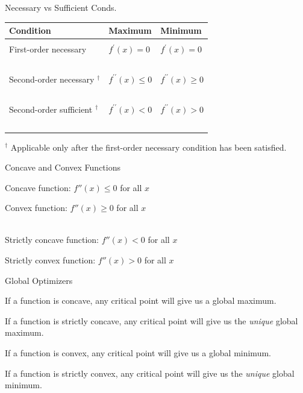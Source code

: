 \documentclass{./../../Latex/teaching_slides}
\begin{document}
\begin{frame}{Necessary vs Sufficient Conds.}
\begin{tabularx}{\textwidth}{lXX}
\hline Condition & Maximum & Minimum \\
\hline \\ 
First-order necessary & $f^{\prime}(x)=0$ & $f^{\prime}(x)=0$ \\~\\
Second-order necessary ${ }^{\dagger}$ & $f^{\prime \prime}(x) \leq 0$ & $f^{\prime \prime}(x) \geq 0$ \\~\\
Second-order sufficient ${ }^{\dagger}$ & $f^{\prime \prime}(x)<0$ & $f^{\prime \prime}(x)>0$ \\~\\
\hline
\end{tabularx}
\vspace{0.25em}

${ }^{\dagger}$ Applicable only after the first-order necessary condition has been satisfied.
\end{frame}

\begin{frame}{Concave and Convex Functions}
\begin{witemize}
  \item Concave function: $ f''(x) \leq 0$ for all $x$ 
  \item Convex function: $ f''(x) \geq 0$ for all $x$ \\~\\
  \item Strictly concave function: $ f''(x) < 0$ for all $x$ 
  \item Strictly convex function: $ f''(x) > 0$ for all $x$ 
\end{witemize}
\end{frame}


\begin{frame}{Global Optimizers}
\begin{witemize}
  \item If a function is concave, any critical point will give us a global maximum.
  \item If a function is strictly concave, any critical point will give us the \textit{unique} global maximum.
  \item If a function is convex, any critical point will give us a global minimum.
  \item If a function is strictly convex, any critical point will give us the \textit{unique} global minimum.
\end{witemize}
\end{frame}
\end{document}
